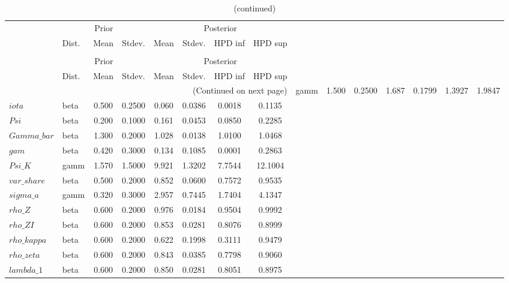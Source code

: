  
\begin{center}
\begin{longtable}{llcccccc} 
\caption{Results from Metropolis-Hastings (parameters)}
 \label{Table:MHPosterior:1}\\
\toprule 
  & \multicolumn{3}{c}{Prior}  &  \multicolumn{4}{c}{Posterior} \\
  \cmidrule(r{.75em}){2-4} \cmidrule(r{.75em}){5-8}
  & Dist. & Mean  & Stdev. & Mean & Stdev. & HPD inf & HPD sup\\
\midrule \endfirsthead 
\caption{(continued)}\\\toprule 
  & \multicolumn{3}{c}{Prior}  &  \multicolumn{4}{c}{Posterior} \\
  \cmidrule(r{.75em}){2-4} \cmidrule(r{.75em}){5-8}
  & Dist. & Mean  & Stdev. & Mean & Stdev. & HPD inf & HPD sup\\
\midrule \endhead 
\bottomrule \multicolumn{8}{r}{(Continued on next page)} \endfoot 
\bottomrule \endlastfoot 
$sigma$ & gamm &   1.500 & 0.2500 &   1.687& 0.1799 &  1.3927 &  1.9847 \\ 
$iota$ & beta &   0.500 & 0.2500 &   0.060& 0.0386 &  0.0018 &  0.1135 \\ 
$Psi$ & beta &   0.200 & 0.1000 &   0.161& 0.0453 &  0.0850 &  0.2285 \\ 
$Gamma\_bar$ & beta &   1.300 & 0.2000 &   1.028& 0.0138 &  1.0100 &  1.0468 \\ 
$gam$ & beta &   0.420 & 0.3000 &   0.134& 0.1085 &  0.0001 &  0.2863 \\ 
$Psi\_K$ & gamm &   1.570 & 1.5000 &   9.921& 1.3202 &  7.7544 & 12.1004 \\ 
$var\_share$ & beta &   0.500 & 0.2000 &   0.852& 0.0600 &  0.7572 &  0.9535 \\ 
$sigma\_a$ & gamm &   0.320 & 0.3000 &   2.957& 0.7445 &  1.7404 &  4.1347 \\ 
$rho\_Z$ & beta &   0.600 & 0.2000 &   0.976& 0.0184 &  0.9504 &  0.9992 \\ 
$rho\_ZI$ & beta &   0.600 & 0.2000 &   0.853& 0.0281 &  0.8076 &  0.8999 \\ 
$rho\_kappa$ & beta &   0.600 & 0.2000 &   0.622& 0.1998 &  0.3111 &  0.9479 \\ 
$rho\_zeta$ & beta &   0.600 & 0.2000 &   0.843& 0.0385 &  0.7798 &  0.9060 \\ 
$lambda\_1$ & beta &   0.600 & 0.2000 &   0.850& 0.0281 &  0.8051 &  0.8975 \\ 
\end{longtable}
 \end{center}
